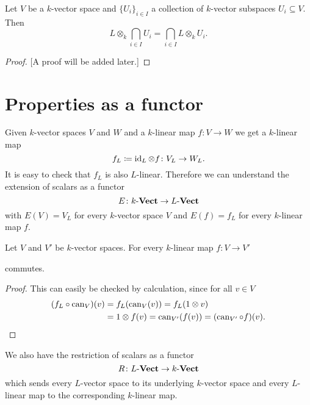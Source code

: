 \begin{lem}
 Let $V$ be a $k$-vector space and $\{U_i\}_{i \in I}$ a collection of $k$-vector subspaces $U_i \subseteq V$. Then
 \[
  L \otimes_k \bigcap_{i \in I} U_i = \bigcap_{i \in I} L \otimes_k U_i.
 \]
\end{lem}
\begin{proof}
 {[A proof will be added later.]}
\end{proof}





\section{Properties as a functor}


Given $k$-vector spaces $V$ and $W$ and a $k$-linear map $f \colon V \to W$ we get a $k$-linear map
\[
 f_L \coloneqq \operatorname{id}_L \otimes f \colon V_L \to W_L.
\]
It is easy to check that $f_L$ is also $L$-linear. Therefore we can understand the extension of scalars as a functor
\[
 E \colon k\text{-}\mathbf{Vect} \to L\text{-}\mathbf{Vect}
\]
with $E(V) = V_L$ for every $k$-vector space $V$ and $E(f) = f_L$ for every $k$-linear map $f$. 

\begin{lem}
 Let $V$ and $V'$ be $k$-vector spaces. For every $k$-linear map $f : V \to V'$
 \begin{center}
 \end{center}
 commutes.
\end{lem}
\begin{proof}
 This can easily be checked by calculation, since for all $v \in V$
 \begin{align*}
  (f_L \circ \operatorname{can}_V)(v)
  &= f_L(\operatorname{can}_V(v))
  = f_L(1 \otimes v) \\
  &= 1 \otimes f(v)
  = \operatorname{can}_{V'}(f(v))
  = (\operatorname{can}_{V'} \circ f)(v).
  \qedhere
 \end{align*}
\end{proof}


We also have the restriction of scalars as a functor
\[
 R \colon L\text{-}\mathbf{Vect} \to k\text{-}\mathbf{Vect}
\]
which sends every $L$-vector space to its underlying $k$-vector space and every $L$-linear map to the corresponding $k$-linear map.
 
